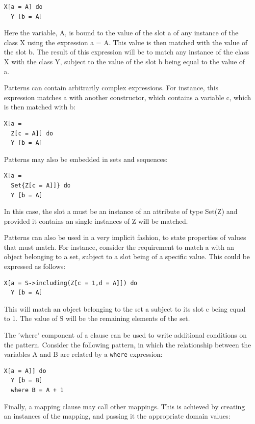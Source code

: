 \begin{lstlisting}
X[a = A] do
  Y [b = A]
\end{lstlisting}
Here the variable, A, is bound to the value of the slot a of any
instance of the class X using the expression a = A. This value is
then matched with the value of the slot b. The result of this
expression will be to match any instance of the class X with the
class Y, subject to the value of the slot b being equal to the
value of a.

Patterns can contain arbitrarily complex expressions. For
instance, this expression matches a with another constructor,
which contains a variable c, which is then matched with b:


\begin{lstlisting}
X[a =
  Z[c = A]] do
  Y [b = A]
\end{lstlisting}\noindent Patterns may also be embedded in sets and sequences:

\begin{lstlisting}
X[a =
  Set{Z[c = A]]} do
  Y [b = A]
\end{lstlisting}In this case, the slot a must be an instance of an attribute of
type Set(Z) and provided it contains an single instances of Z will
be matched.

Patterns can also be used in a very implicit fashion, to state
properties of values that must match. For instance, consider the
requirement to match a with an object belonging to a set, subject
to a slot being of a specific value. This could be expressed as
follows:

\begin{lstlisting}
X[a = S->including(Z[c = 1,d = A]]) do
  Y [b = A]
\end{lstlisting}This will match an object belonging to the set a subject to its
slot c being equal to 1. The value of S will be the remaining
elements of the set.

The 'where' component of a clause can be used to write additional
conditions on the pattern. Consider the following pattern, in
which the relationship between the variables A and B are related
by a {\tt where} expression:

\begin{lstlisting}
X[a = A]] do
  Y [b = B]
  where B = A + 1
\end{lstlisting}Finally, a mapping clause may call other mappings. This is
achieved by creating an instances of the mapping, and passing it
the appropriate domain values:

